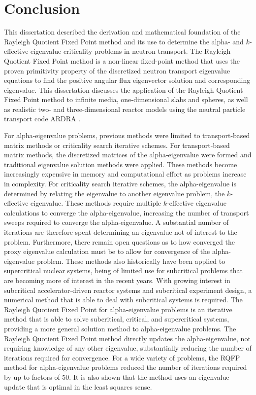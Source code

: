 \chapter{Conclusion}
\label{ch:Conc}

This dissertation described the derivation and mathematical foundation of the Rayleigh Quotient Fixed Point method and its use to determine the alpha- and $k$-effective eigenvalue criticality problems in neutron transport. The Rayleigh Quotient Fixed Point method is a non-linear fixed-point method that uses the proven primitivity property of the discretized neutron transport eigenvalue equations to find the positive angular flux eigenvector solution and corresponding eigenvalue. This dissertation discusses the application of the Rayleigh Quotient Fixed Point method to infinite media, one-dimensional slabs and spheres, as well as realistic two- and three-dimensional reactor models using the neutral particle transport code ARDRA \cite{hanebutte_ardra_1999}.

For alpha-eigenvalue problems, previous methods were limited to transport-based matrix methods or criticality search iterative schemes. For transport-based matrix methods, the discretized matrices of the alpha-eigenvalue were formed and traditional eigenvalue solution methods were applied. These methods become increasingly expensive in memory and computational effort as problems increase in complexity. For criticality search iterative schemes, the alpha-eigenvalue is determined by relating the eigenvalue to another eigenvalue problem, the $k$-effective eigenvalue. These methods require multiple $k$-effective eigenvalue calculations to converge the alpha-eigenvalue, increasing the number of transport sweeps required to converge the alpha-eigenvalue. A substantial number of iterations are therefore spent determining an eigenvalue not of interest to the problem. Furthermore, there remain open questions as to how converged the proxy eigenvalue calculation must be to allow for convergence of the alpha-eigenvalue problem. These methods also historically have been applied to supercritical nuclear systems, being of limited use for subcritical problems that are becoming more of interest in  the recent years. With growing interest in subcritical accelerator-driven reactor systems and subcritical experiment design, a numerical method that is able to deal with subcritical systems is required. The Rayleigh Quotient Fixed Point for alpha-eigenvalue problems is an iterative method that is able to solve subcritical, critical, and supercritical systems, providing a more general solution method to alpha-eigenvalue problems. The Rayleigh Quotient Fixed Point method directly updates the alpha-eigenvalue, not requiring knowledge of any other eigenvalue, substantially reducing the number of iterations required for convergence. For a wide variety of problems, the RQFP method for alpha-eigenvalue problems reduced the number of iterations required by up to factors of 50. It is also shown that the method uses an eigenvalue update that is optimal in the least squares sense.

